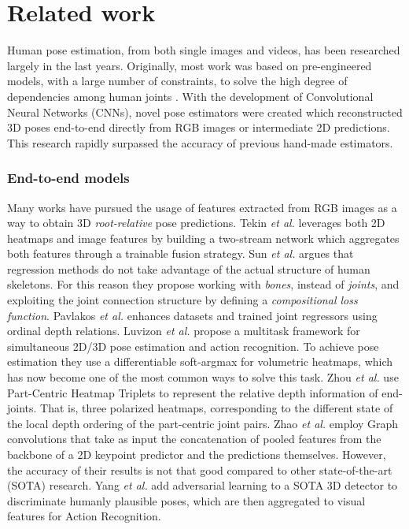 \documentclass[letterpaper]{article}
\begin{document}
\section{Related work}
Human pose estimation, from both single images and videos, has been researched   largely in the last years. Originally, most work was based on pre-engineered models, with a large number of constraints, to solve the high degree of dependencies among human joints \cite{ionescu13, ionescu14, amin13, ramakrishna12}. With the development of Convolutional Neural Networks (CNNs), novel pose estimators were created which reconstructed 3D poses end-to-end directly from RGB images or intermediate 2D predictions. This research rapidly surpassed the accuracy of previous hand-made estimators.
\\
\subsubsection{End-to-end models}
Many works have pursued the usage of features extracted from RGB images as a way to obtain 3D \textit{root-relative} pose predictions. Tekin \textit{et al.} \cite{tekin17} leverages both 2D heatmaps and image features by building a two-stream network which aggregates both features through a trainable fusion strategy. Sun \textit{et al. } \cite{sun17} argues that regression methods do not take advantage of the actual structure of human skeletons. For this reason they propose working with \textit{bones}, instead of \textit{joints}, and exploiting the joint connection structure by defining a \textit{compositional loss function}. Pavlakos \textit{et al.} \cite{pavlakos18} enhances datasets and trained joint regressors using ordinal depth relations. Luvizon \textit{et al.} \cite{luvizon18} propose a multitask framework for simultaneous 2D/3D pose estimation and action recognition. To achieve pose estimation they use a differentiable soft-argmax for volumetric heatmaps, which has now become one of the most common ways to solve this task. Zhou \textit{et al.} \cite{zhou19} use Part-Centric Heatmap Triplets to represent the relative depth information of end-joints. That is, three polarized heatmaps, corresponding to the different state of the local depth ordering of the part-centric joint pairs. Zhao \textit{et al.} \cite{zhao19} employ Graph convolutions that take as input the concatenation of pooled features from the backbone of a 2D keypoint predictor and the predictions themselves. However, the accuracy of their results is not that good compared to other state-of-the-art (SOTA) research. Yang \textit{et al.} \cite{yang18} add adversarial learning to a SOTA 3D detector to discriminate humanly plausible poses, which are then aggregated to visual features for Action Recognition.
\end{document}
